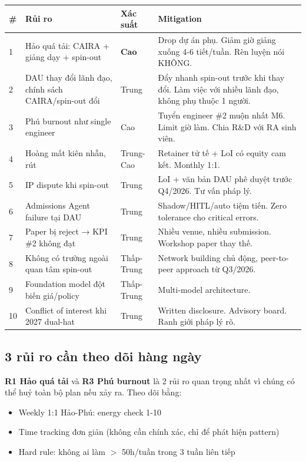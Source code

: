 \documentclass[11pt,a4paper]{article}
\begin{document}
\begin{tabularx}{\linewidth}{@{}p{0.5cm} p{4.5cm} p{1.8cm} X@{}}
\toprule
\textbf{\#} & \textbf{Rủi ro} & \textbf{Xác suất} & \textbf{Mitigation} \\
\midrule
1 & Hảo quá tải: CAIRA + giảng dạy + spin-out & \textbf{Cao} & Drop dự án phụ. Giảm giờ giảng xuống 4-6 tiết/tuần. Rèn luyện nói KHÔNG. \\
2 & DAU thay đổi lãnh đạo, chính sách CAIRA/spin-out đổi & Trung & Đẩy nhanh spin-out trước khi thay đổi. Làm việc với nhiều lãnh đạo, không phụ thuộc 1 người. \\
3 & Phú burnout như single engineer & Cao & Tuyển engineer \#2 muộn nhất M6. Limit giờ làm. Chia R\&D với RA sinh viên. \\
4 & Hoàng mất kiên nhẫn, rút & Trung-Cao & Retainer tử tế + LoI có equity cam kết. Monthly 1:1. \\
5 & IP dispute khi spin-out & Trung & LoI + văn bản DAU phê duyệt trước Q4/2026. Tư vấn pháp lý. \\
6 & Admissions Agent failure tại DAU & Trung & Shadow/HITL/auto tiệm tiến. Zero tolerance cho critical errors. \\
7 & Paper bị reject → KPI \#2 không đạt & Trung & Nhiều venue, nhiều submission. Workshop paper thay thế. \\
8 & Không có trường ngoài quan tâm spin-out & Thấp-Trung & Network building chủ động, peer-to-peer approach từ Q3/2026. \\
9 & Foundation model đột biến giá/policy & Thấp-Trung & Multi-model architecture. \\
10 & Conflict of interest khi 2027 dual-hat & Trung & Written disclosure. Advisory board. Ranh giới pháp lý rõ. \\
\bottomrule
\end{tabularx}

\subsection{3 rủi ro cần theo dõi hàng ngày}

\textbf{R1 Hảo quá tải} và \textbf{R3 Phú burnout} là 2 rủi ro quan trọng nhất
vì chúng có thể huỷ toàn bộ plan nếu xảy ra. Theo dõi bằng:

\begin{itemize}
\item Weekly 1:1 Hảo-Phú: energy check 1-10
\item Time tracking đơn giản (không cần chính xác, chỉ để phát hiện pattern)
\item Hard rule: không ai làm $>$ 50h/tuần trong 3 tuần liên tiếp
\end{itemize}
\end{document}
